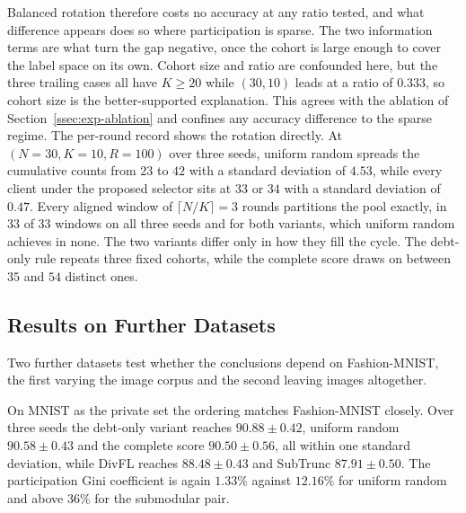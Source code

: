 \documentclass[journal]{IEEEtran}
\newcommand{\rev}[1]{{\color{blue}#1}}
\begin{document}
\rev{Balanced rotation therefore costs no accuracy at any ratio tested, and what difference appears does so where participation is sparse. The two information terms are what turn the gap negative, once the cohort is large enough to cover the label space on its own. Cohort size and ratio are confounded here, but the three trailing cases all have $K \ge 20$ while $(30,10)$ leads at a ratio of $0.333$, so cohort size is the better-supported explanation. This agrees with the ablation of Section~\ref{ssec:exp-ablation} and confines any accuracy difference to the sparse regime. The per-round record shows the rotation directly. At $(N = 30, K = 10, R = 100)$ over three seeds, uniform random spreads the cumulative counts from $23$ to $42$ with a standard deviation of $4.53$, while every client under the proposed selector sits at $33$ or $34$ with a standard deviation of $0.47$. Every aligned window of $\lceil N/K \rceil = 3$ rounds partitions the pool exactly, in $33$ of $33$ windows on all three seeds and for both variants, which uniform random achieves in none. The two variants differ only in how they fill the cycle. The debt-only rule repeats three fixed cohorts, while the complete score draws on between $35$ and $54$ distinct ones.}

\subsection{Results on Further Datasets}
\label{ssec:exp-cross-dataset}

\rev{Two further datasets test whether the conclusions depend on Fashion-MNIST, the first varying the image corpus and the second leaving images altogether.}

\rev{On MNIST as the private set the ordering matches Fashion-MNIST closely. Over three seeds the debt-only variant reaches $90.88 \pm 0.42$, uniform random $90.58 \pm 0.43$ and the complete score $90.50 \pm 0.56$, all within one standard deviation, while DivFL reaches $88.48 \pm 0.43$ and SubTrunc $87.91 \pm 0.50$. The participation Gini coefficient is again $1.33\%$ against $12.16\%$ for uniform random and above $36\%$ for the submodular pair.}
\end{document}
